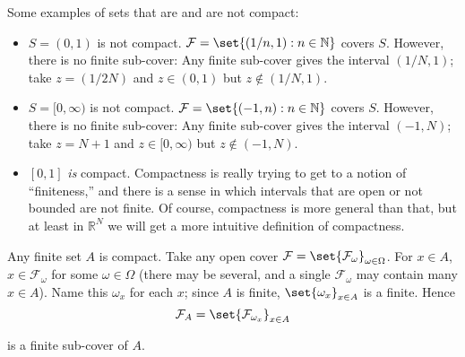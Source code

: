 \documentclass{article}
\begin{document}
Some examples of sets that are and are not compact:
\begin{itemize}[label=$\bullet$]
  \item $S = (0, 1)$ is not compact. $\mathcal{F} = \set{(1/n, 1): n \in \mathbb{N}}$ covers $S$. However, there is no finite sub-cover: Any finite sub-cover gives the interval $(1/N, 1)$; take $z = (1/2N)$ and $z \in (0, 1)$ but $z \notin (1/N, 1)$.

  \item $S = [0, \infty)$ is not compact. $\mathcal{F} = \set{(-1, n): n \in \mathbb{N}}$ covers $S$. However, there is no finite sub-cover: Any finite sub-cover gives the interval $(-1, N)$; take $z = N + 1$ and $z \in [0, \infty)$ but $z \notin (-1, N)$.

  \item $[0, 1]$ \textit{is} compact. Compactness is really trying to get to a notion of ``finiteness,'' and there is a sense in which intervals that are open or not bounded are not finite. Of course, compactness is more general than that, but at least in $\mathbb{R}^N$ we will get a more intuitive definition of compactness.
\end{itemize}

\begin{remark}
  Any finite set $A$ is compact. Take any open cover $\mathcal{F} = \set{\mathcal{F}_\omega}_{\omega \in \Omega}$. For $x \in A$, $x \in \mathcal{F}_\omega$ for some $\omega \in \Omega$ (there may be several, and a single $\mathcal{F}_\omega$ may contain many $x \in A$). Name this $\omega_x$ for each $x$; since $A$ is finite, $\set{\omega_x}_{x \in A}$ is a finite. Hence
  \[
    \mathcal{F}_A = \set{\mathcal{F}_{\omega_x}}_{x \in A}
  \]

  is a finite sub-cover of $A$.
\end{remark}
\end{document}

